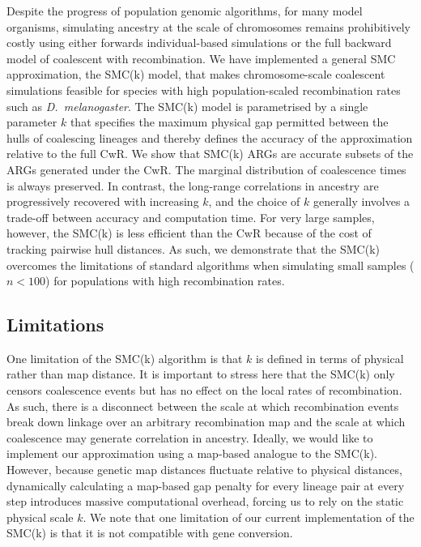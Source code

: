 \documentclass[9pt,twocolumn,twoside,lineno]{gsajnl}
\begin{document}
Despite the progress of population genomic algorithms, for many model organisms, simulating ancestry at the scale of chromosomes remains prohibitively costly using either forwards individual-based simulations or the full backward model of coalescent with recombination. We have implemented a general SMC approximation, the SMC(k) model, that makes chromosome-scale coalescent simulations feasible for species with high population-scaled recombination rates such as \textit{D.\ melanogaster}. The SMC(k) model is parametrised by a single parameter $k$ that specifies the maximum physical gap permitted between the hulls of coalescing lineages and thereby defines the accuracy of the approximation relative to the full CwR. We show that SMC(k) ARGs are accurate subsets of the ARGs generated under the CwR. The marginal distribution of coalescence times is always preserved. In contrast, the long-range correlations in ancestry are progressively recovered with increasing $k$, and the choice of $k$ generally involves a trade-off between accuracy and computation time. For very large samples, however, the SMC(k) is less efficient than the CwR because  of the cost of tracking pairwise hull distances. As such, we demonstrate that the SMC(k) overcomes the limitations of standard algorithms when simulating small samples ($n<100$) for populations with high recombination rates.


\subsection{Limitations}
One limitation of the SMC(k) algorithm is that $k$ is defined in terms of physical rather than map distance. It is important to stress here that the SMC(k) only censors coalescence events but has no effect on the local rates of recombination. As such, there is a disconnect between the scale at which recombination events break down linkage over an arbitrary recombination map and the scale at which coalescence may generate correlation in ancestry. Ideally, we would like to implement our approximation using a map-based analogue to the SMC(k). However, because genetic map distances fluctuate relative to physical distances, dynamically calculating a map-based gap penalty for every lineage pair at every step introduces massive computational overhead, forcing us to rely on the static physical scale $k$. We note that one limitation of our current implementation of the SMC(k) is that it is not compatible with gene conversion.
\end{document}
